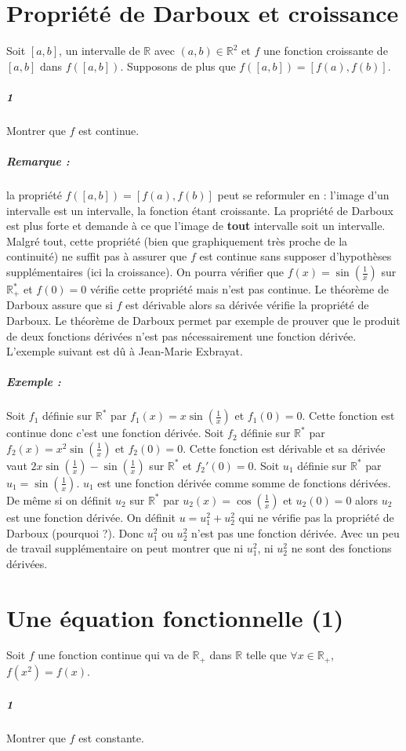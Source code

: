 \documentclass[10pt,a4paper]{article}
\begin{document}
\section{Propriété de Darboux et croissance}
Soit $\left[a,b\right]$, un intervalle de $\mathbb{R}$ avec $(a,b) \in \mathbb{R}^2$ et $f$ une fonction croissante de $[a,b]$ dans $f([a,b])$. Supposons de plus que $f([a,b])=[f(a),f(b)]$.
\subparagraph{1}Montrer que $f$ est continue.
\subparagraph{Remarque :} la propriété $f([a,b])=[f(a),f(b)]$ peut se reformuler en : l'image d'un intervalle est un intervalle, la fonction étant croissante. La propriété de Darboux est plus forte et demande à ce que l'image de \textbf{tout} intervalle soit un intervalle. Malgré tout, cette propriété (bien que graphiquement très proche de la continuité) ne suffit pas à assurer que $f$ est continue sans supposer d'hypothèses supplémentaires (ici la croissance). On pourra vérifier que $f(x)=\sin(\frac{1}{x})$ sur $\mathbb{R}_{+}^{*}$ et $f(0)=0$ vérifie cette propriété mais n'est pas continue. Le théorème de Darboux assure que si $f$ est dérivable alors sa dérivée vérifie la propriété de Darboux. Le théorème de Darboux permet par exemple de prouver que le produit de deux fonctions dérivées n'est pas nécessairement une fonction dérivée. L'exemple suivant est dû à Jean-Marie Exbrayat.
\subparagraph{Exemple :} Soit $f_1$ définie sur $\mathbb{R}^*$ par $f_1(x) = x\sin \left(\frac{1}{x}\right)$ et $f_1(0)=0$. Cette fonction est continue donc c'est une fonction dérivée. Soit $f_2$ définie sur $\mathbb{R}^*$ par $f_2(x) = x^2 \sin \left( \frac{1}{x} \right)$ et $f_2(0)=0$. Cette fonction est dérivable et sa dérivée vaut $2x\sin \left(\frac{1}{x} \right) - \sin \left( \frac{1}{x} \right)$ sur $\mathbb{R}^*$ et $f_2'(0)=0$. Soit $u_1$ définie sur $\mathbb{R}^*$ par $u_1=\sin \left( \frac{1}{x} \right)$. $u_1$ est une fonction dérivée comme somme de fonctions dérivées. De même si on définit $u_2$ sur $\mathbb{R}^*$ par $u_2(x)= \cos \left( \frac{1}{x} \right)$ et $u_2(0)=0$ alors $u_2$ est une fonction dérivée. On définit $u = u_1^2+u_2^2$ qui ne vérifie pas la propriété de Darboux (pourquoi ?). Donc $u_1^2$ ou $u_2^2$ n'est pas une fonction dérivée. Avec un peu de travail supplémentaire on peut montrer que ni $u_1^2$, ni $u_2^2$ ne sont des fonctions dérivées.

\section{Une équation fonctionnelle (1)}
Soit $f$ une fonction continue qui va de $\mathbb{R}_{+}$ dans $\mathbb{R}$ telle que $\forall x \in \mathbb{R}_{+}$, $f(x^2)=f(x)$.
\subparagraph{1}Montrer que $f$ est constante.
\end{document}
